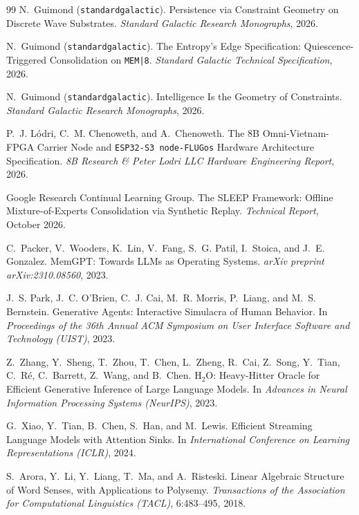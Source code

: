 \documentclass[10pt, twocolumn, a4paper]{article}
\begin{document}
\begin{thebibliography}{99}
N.~Guimond (\texttt{standardgalactic}).
\newblock Persistence via Constraint Geometry on Discrete Wave Substrates.
\newblock \emph{Standard Galactic Research Monographs}, 2026.

N.~Guimond (\texttt{standardgalactic}).
\newblock The Entropy's Edge Specification: Quiescence-Triggered Consolidation on \texttt{MEM|8}.
\newblock \emph{Standard Galactic Technical Specification}, 2026.

N.~Guimond (\texttt{standardgalactic}).
\newblock Intelligence Is the Geometry of Constraints.
\newblock \emph{Standard Galactic Research Monographs}, 2026.

P.~J. L{\'o}dri, C.~M. Chenoweth, and A.~Chenoweth.
\newblock The 8B Omni-Vietnam-FPGA Carrier Node and \texttt{ESP32-S3 node-FLUGos} Hardware Architecture Specification.
\newblock \emph{8B Research \& Peter Lodri LLC Hardware Engineering Report}, 2026.

Google Research Continual Learning Group.
\newblock The SLEEP Framework: Offline Mixture-of-Experts Consolidation via Synthetic Replay.
\newblock \emph{Technical Report}, October 2026.

C.~Packer, V.~Wooders, K.~Lin, V.~Fang, S.~G. Patil, I.~Stoica, and J.~E. Gonzalez.
\newblock MemGPT: Towards LLMs as Operating Systems.
\newblock \emph{arXiv preprint arXiv:2310.08560}, 2023.

J.~S. Park, J.~C. O'Brien, C.~J. Cai, M.~R. Morris, P.~Liang, and M.~S. Bernstein.
\newblock Generative Agents: Interactive Simulacra of Human Behavior.
\newblock In \emph{Proceedings of the 36th Annual ACM Symposium on User Interface Software and Technology (UIST)}, 2023.

Z.~Zhang, Y.~Sheng, T.~Zhou, T.~Chen, L.~Zheng, R.~Cai, Z.~Song, Y.~Tian, C.~R{\'e}, C.~Barrett, Z.~Wang, and B.~Chen.
\newblock H$_2$O: Heavy-Hitter Oracle for Efficient Generative Inference of Large Language Models.
\newblock In \emph{Advances in Neural Information Processing Systems (NeurIPS)}, 2023.

G.~Xiao, Y.~Tian, B.~Chen, S.~Han, and M.~Lewis.
\newblock Efficient Streaming Language Models with Attention Sinks.
\newblock In \emph{International Conference on Learning Representations (ICLR)}, 2024.

S.~Arora, Y.~Li, Y.~Liang, T.~Ma, and A.~Risteski.
\newblock Linear Algebraic Structure of Word Senses, with Applications to Polysemy.
\newblock \emph{Transactions of the Association for Computational Linguistics (TACL)}, 6:483--495, 2018.


\end{thebibliography}
\end{document}
